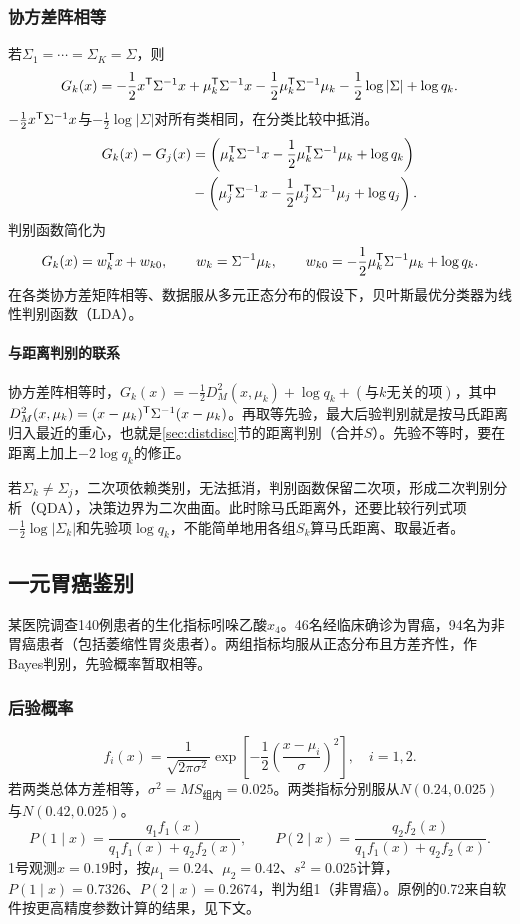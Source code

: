 \subsubsection{协方差阵相等}
若$\Sigma_1=\cdots=\Sigma_K=\Sigma$，则
\[
G_k(x)=-\frac12x^{\mathsf T}\Sigma^{-1}x+\mu_k^{\mathsf T}\Sigma^{-1}x
-\frac12\mu_k^{\mathsf T}\Sigma^{-1}\mu_k-\frac12\log|\Sigma|+\log q_k.
\]
$-\tfrac12x^{\mathsf T}\Sigma^{-1}x$与$-\tfrac12\log|\Sigma|$对所有类相同，在分类比较中抵消。
\begin{align*}
G_k(x)-G_j(x)&=\left(\mu_k^{\mathsf T}\Sigma^{-1}x-\frac12\mu_k^{\mathsf T}\Sigma^{-1}\mu_k+\log q_k\right)\\
&-\left(\mu_j^{\mathsf T}\Sigma^{-1}x-\frac12\mu_j^{\mathsf T}\Sigma^{-1}\mu_j+\log q_j\right).
\end{align*}
判别函数简化为
\begin{equation}
G_k(x)=w_k^{\mathsf T} x+w_{k0},\qquad
w_k=\Sigma^{-1}\mu_k,\qquad
w_{k0}=-\frac12\mu_k^{\mathsf T}\Sigma^{-1}\mu_k+\log q_k.
\end{equation}
在各类协方差矩阵相等、数据服从多元正态分布的假设下，贝叶斯最优分类器为线性判别函数（LDA）。
\paragraph{与距离判别的联系} 协方差阵相等时，$G_k(x)=-\frac12D_M^2(x,\mu_k)+\log q_k+(\text{与$k$无关的项})$，其中$D_M^2(x,\mu_k)=(x-\mu_k)^{\mathsf T}\Sigma^{-1}(x-\mu_k)$。再取等先验，最大后验判别就是按马氏距离归入最近的重心，也就是\ref{sec:distdisc}节的距离判别（合并$S$）。先验不等时，要在距离上加上$-2\log q_k$的修正。

若$\Sigma_k\ne\Sigma_j$，二次项依赖类别，无法抵消，判别函数保留二次项，形成二次判别分析（QDA），决策边界为二次曲面。此时除马氏距离外，还要比较行列式项$-\frac12\log|\Sigma_k|$和先验项$\log q_k$，不能简单地用各组$S_k$算马氏距离、取最近者。
\subsection{一元胃癌鉴别}
某医院调查140例患者的生化指标吲哚乙酸$x_4$。46名经临床确诊为胃癌，94名为非胃癌患者（包括萎缩性胃炎患者）。两组指标均服从正态分布且方差齐性，作Bayes判别，先验概率暂取相等。
\subsubsection{后验概率}
\[
f_i(x)=\frac{1}{\sqrt{2\pi\sigma^2}}
\exp\left[-\frac12\left(\frac{x-\mu_i}{\sigma}\right)^2\right],\quad i=1,2.
\]
若两类总体方差相等，$\sigma^2=MS_{\text{组内}}=0.025$。两类指标分别服从$N(0.24,0.025)$与$N(0.42,0.025)$。
\[
P(1\mid x)=\frac{q_1f_1(x)}{q_1f_1(x)+q_2f_2(x)},\qquad
P(2\mid x)=\frac{q_2f_2(x)}{q_1f_1(x)+q_2f_2(x)}.
\]
1号观测$x=0.19$时，按$\mu_1=0.24$、$\mu_2=0.42$、$s^2=0.025$计算，$P(1\mid x)=0.7326$、$P(2\mid x)=0.2674$，判为组1（非胃癌）。原例的0.72来自软件按更高精度参数计算的结果，见下文。
